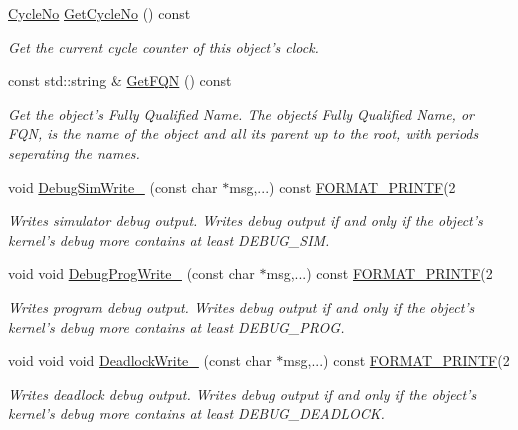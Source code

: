 \begin{DoxyCompactItemize}
\hyperlink{namespace_simulator_a928f1e2101eba21bb0fe409e8c9ce573}{Cycle\+No} \hyperlink{class_simulator_1_1_object_a73a98bdee9f46ee0b0fc6f1278140232}{Get\+Cycle\+No} () const 
\begin{DoxyCompactList}\small\item\em Get the current cycle counter of this object's clock. \end{DoxyCompactList}\item 
const std\+::string \& \hyperlink{class_simulator_1_1_object_acdedc3a463d9d0d4aa7174025e8f206a}{Get\+F\+Q\+N} () const 
\begin{DoxyCompactList}\small\item\em Get the object's Fully Qualified Name. The objectś Fully Qualified Name, or F\+Q\+N, is the name of the object and all its parent up to the root, with periods seperating the names. \end{DoxyCompactList}\item 
void \hyperlink{class_simulator_1_1_object_ac18fe0bae8ae9c2afb64ca9b07fcd697}{Debug\+Sim\+Write\+\_\+} (const char $\ast$msg,...) const \hyperlink{types_8h_ab2def27d383f13e3b829472479dcf856}{F\+O\+R\+M\+A\+T\+\_\+\+P\+R\+I\+N\+T\+F}(2
\begin{DoxyCompactList}\small\item\em Writes simulator debug output. Writes debug output if and only if the object's kernel's debug more contains at least D\+E\+B\+U\+G\+\_\+\+S\+I\+M. \end{DoxyCompactList}\item 
void void \hyperlink{class_simulator_1_1_object_abe6d39c1d8696aa354931ba243486594}{Debug\+Prog\+Write\+\_\+} (const char $\ast$msg,...) const \hyperlink{types_8h_ab2def27d383f13e3b829472479dcf856}{F\+O\+R\+M\+A\+T\+\_\+\+P\+R\+I\+N\+T\+F}(2
\begin{DoxyCompactList}\small\item\em Writes program debug output. Writes debug output if and only if the object's kernel's debug more contains at least D\+E\+B\+U\+G\+\_\+\+P\+R\+O\+G. \end{DoxyCompactList}\item 
void void void \hyperlink{class_simulator_1_1_object_a5cba1c0e46b7f86591703317f97deec1}{Deadlock\+Write\+\_\+} (const char $\ast$msg,...) const \hyperlink{types_8h_ab2def27d383f13e3b829472479dcf856}{F\+O\+R\+M\+A\+T\+\_\+\+P\+R\+I\+N\+T\+F}(2
\begin{DoxyCompactList}\small\item\em Writes deadlock debug output. Writes debug output if and only if the object's kernel's debug more contains at least D\+E\+B\+U\+G\+\_\+\+D\+E\+A\+D\+L\+O\+C\+K. \end{DoxyCompactList}\item 

\end{DoxyCompactItemize}
